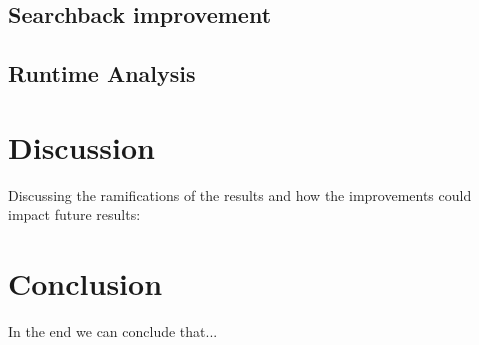 \documentclass[12pt, danish, a4paper, titlepage]{article}
\begin{document}
		\subsection{Searchback improvement}
		\subsection{Runtime Analysis}
		
	\section{Discussion}
	Discussing the ramifications of the results and how the improvements could impact future results: 
	
	\section{Conclusion}
	In the end we can conclude that...
		
	
\end{document}
